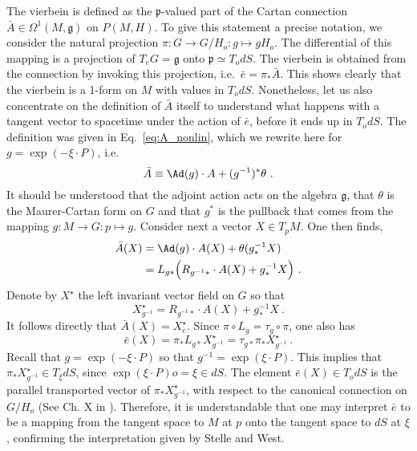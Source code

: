 \documentclass[11pt]{article}
\begin{document}
The vierbein is defined as the $\mathfrak{p}$-valued part of the 
Cartan connection $\bar{A} \in \Omega^1(M,\mathfrak{g})$ on 
$P(M,H)$. To give this statement a precise notation, we consider 
the natural projection $\pi : G \to G/H_o : g \mapsto gH_o$. The 
differential of this mapping is a projection of $T_eG = 
\mathfrak{g}$ onto $\mathfrak{p} \simeq T_o dS$. The vierbein is 
obtained from the connection by invoking this projection, 
i.e.~$\bar{e} = \pi_\ast \bar{A}$. This shows clearly that the 
vierbein is a 1-form on $M$ with values in $T_odS$. Nonetheless, 
let us also concentrate on the definition  of $\bar{A}$ itself to 
understand what happens with a tangent vector to spacetime under 
the action of $\bar{e}$, before it ends up in $T_o dS$. The 
definition  was given in Eq.~\eqref{eq:A_nonlin}, which we 
rewrite here for $g = \exp(-\xi\cdot P)$, i.e.~
\begin{displaymath}
	\bar{A} \equiv \Ad(g)\cdot A + (g^{-1})^\ast \theta~.
\end{displaymath}
It should be understood that the adjoint action acts on the 
algebra $\mathfrak{g}$, that $\theta$ is the Maurer-Cartan form 
on $G$ and that $g^\ast$ is the pullback that comes from the 
mapping $g: M \to G : p \mapsto g$. Consider next a vector $X \in 
T_pM$. One then finds,
\begin{align*}
	\bar{A}(X) &= \Ad(g)\cdot A(X) + \theta(g^{-1}_\ast X) \\
		&= L_{g\ast}\Big(R_{g^{-1}\ast}\cdot A(X) + g^{-1}_\ast X 
		\Big)~.
\end{align*}
Denote by $X^\star$ the left invariant vector field on $G$ so 
that
\begin{displaymath}
	X^\star_{g^{-1}} = R_{g^{-1}\ast}\cdot A(X) + g^{-1}_\ast X~.
\end{displaymath}
It follows directly that $\bar{A}(X) = X^\star_e$. Since $\pi 
\circ L_g = \tau_g \circ \pi$, one also has
\begin{displaymath}
	\bar{e}(X) = \pi_\ast L_{g\ast} X^\star_{g^{-1}}
	= \tau_{g\ast} \pi_\ast X^\star_{g^{-1}}~.
\end{displaymath}
Recall that $g = \exp(-\xi\cdot P)$ so that $g^{-1} = 
\exp(\xi\cdot P)$. This implies that $\pi_\ast X^\star_{g^{-1}} 
\in T_\xi dS$, since $\exp(\xi\cdot P)o = \xi \in dS$. The 
element $\bar{e}(X) \in T_o dS$ is the parallel transported 
vector of $\pi_\ast X^\star_{g^{-1}}$, with respect to the 
canonical connection on $G/H_o$ (See Ch. X in 
\cite{kob1996found}).  Therefore, it is understandable that one 
may interpret $\bar{e}$ to be a mapping from the tangent space to 
$M$ at $p$ onto the tangent space to $dS$ at $\xi$, confirming 
the interpretation given by Stelle and West.
\end{document}
